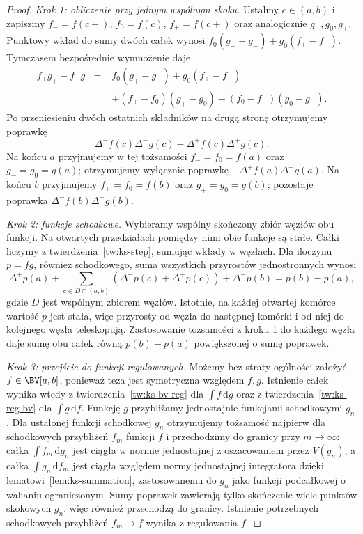 \begin{proof}
\emph{Krok 1: obliczenie przy jednym wspólnym skoku.} Ustalmy $c\in(a,b)$ i zapiszmy $f_-=f(c-)$, $f_0=f(c)$, $f_+=f(c+)$ oraz analogicznie $g_-,g_0,g_+$. Punktowy wkład do sumy dwóch całek wynosi $f_0(g_+-g_-)+g_0(f_+-f_-)$. Tymczasem bezpośrednie wymnożenie daje
\[
 \begin{aligned}
 f_+g_+-f_-g_-={}&f_0(g_+-g_-)+g_0(f_+-f_-)\\
 &+(f_+-f_0)(g_+-g_0)-(f_0-f_-)(g_0-g_-).
 \end{aligned}
\]
Po przeniesieniu dwóch ostatnich składników na drugą stronę otrzymujemy poprawkę
\[
 \Delta^-f(c)\Delta^-g(c)-\Delta^+f(c)\Delta^+g(c).
\] Na końcu $a$ przyjmujemy w tej tożsamości $f_-=f_0=f(a)$ oraz $g_-=g_0=g(a)$; otrzymujemy wyłącznie poprawkę $-\Delta^+f(a)\Delta^+g(a)$. Na końcu $b$ przyjmujemy $f_+=f_0=f(b)$ oraz $g_+=g_0=g(b)$; pozostaje poprawka $\Delta^-f(b)\Delta^-g(b)$.

\emph{Krok 2: funkcje schodkowe.} Wybieramy wspólny skończony zbiór węzłów obu funkcji. Na otwartych przedziałach pomiędzy nimi obie funkcje są stałe. Całki liczymy z twierdzenia~\ref{tw:ks-step}, sumując wkłady w węzłach. Dla iloczynu $p=fg$, również schodkowego, suma wszystkich przyrostów jednostronnych wynosi
\[
 \Delta^+p(a)+\sum_{c\in D\cap(a,b)}
 (\Delta^-p(c)+\Delta^+p(c))+\Delta^-p(b)
 =p(b)-p(a),
\]
gdzie $D$ jest wspólnym zbiorem węzłów. Istotnie, na każdej otwartej komórce wartość $p$ jest stała, więc przyrosty od węzła do następnej komórki i od niej do kolejnego węzła teleskopują. Zastosowanie tożsamości z kroku 1 do każdego węzła daje sumę obu całek równą $p(b)-p(a)$ powiększonej o sumę poprawek.

\emph{Krok 3: przejście do funkcji regulowanych.} Możemy bez straty ogólności założyć $f\in\BV[a,b]$, ponieważ teza jest symetryczna względem $f,g$. Istnienie całek wynika wtedy z twierdzenia~\ref{tw:ks-bv-reg} dla $\int f\,\mathrm dg$ oraz z twierdzenia~\ref{tw:ks-reg-bv} dla $\int g\,\mathrm df$. Funkcję $g$ przybliżamy jednostajnie funkcjami schodkowymi $g_n$. Dla ustalonej funkcji schodkowej $g_n$ otrzymujemy tożsamość najpierw dla schodkowych przybliżeń $f_m$ funkcji $f$ i przechodzimy do granicy przy $m\to\infty$: całka $\int f_m\,\mathrm dg_n$ jest ciągła w normie jednostajnej z oszacowaniem przez $V(g_n)$, a całka $\int g_n\,\mathrm df_m$ jest ciągła względem normy jednostajnej integratora dzięki lematowi~\ref{lem:ks-summation}, zastosowanemu do $g_n$ jako funkcji podcałkowej o wahaniu ograniczonym. Sumy poprawek zawierają tylko skończenie wiele punktów skokowych $g_n$, więc również przechodzą do granicy. Istnienie potrzebnych schodkowych przybliżeń $f_m\to f$ wynika z regulowania $f$.


\end{proof}
